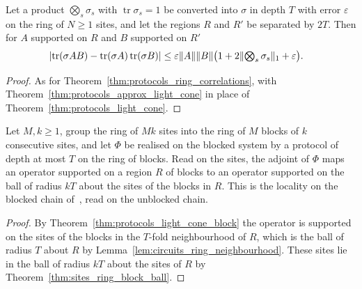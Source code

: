 \begin{theorem}
    \label{thm:protocols_ring_approx_correlations}
    \leanok
    Let a product $\bigotimes_s\sigma_s$ with $\operatorname{tr}\sigma_s=1$ be converted into
    $\sigma$ in depth $T$ with error $\varepsilon$ on the ring of $N\ge1$ sites, and let the
    regions $R$ and $R'$ be separated by $2T$. Then for $A$ supported on $R$ and $B$ supported
    on $R'$
    \begin{align}
        \lvert\operatorname{tr}(\sigma AB)
        -\operatorname{tr}(\sigma A)\operatorname{tr}(\sigma B)\rvert
        &\le\varepsilon\lVert A\rVert\lVert B\rVert
        \bigl(1+2\lVert\textstyle\bigotimes_s\sigma_s\rVert_1+\varepsilon\bigr).
        \notag
    \end{align}
\end{theorem}
\begin{proof}\leanok
    As for Theorem~\ref{thm:protocols_ring_correlations}, with
    Theorem~\ref{thm:protocols_approx_light_cone} in place of
    Theorem~\ref{thm:protocols_light_cone}.
\end{proof}

\begin{theorem}
    \label{thm:protocols_ring_block_light_cone}
    \leanok
    Let $M,k\ge1$, group the ring of $Mk$ sites into the ring of $M$ blocks of $k$
    consecutive sites, and let $\Phi$ be realised on the blocked system by a protocol of depth
    at most $T$ on the ring of blocks. Read on the sites, the adjoint of $\Phi$ maps an
    operator supported on a region $R$ of blocks to an operator supported on the ball of
    radius $kT$ about the sites of the blocks in $R$. This is the locality on the blocked
    chain of~\cite[main text]{Piroli2021LOCC}, read on the unblocked chain.
\end{theorem}
\begin{proof}\leanok
    By Theorem~\ref{thm:protocols_light_cone_block} the operator is supported on the sites of
    the blocks in the $T$-fold neighbourhood of $R$, which is the ball of radius $T$ about $R$
    by Lemma~\ref{lem:circuits_ring_neighbourhood}. These sites lie in the ball of radius
    $kT$ about the sites of $R$ by Theorem~\ref{thm:sites_ring_block_ball}.
\end{proof}

